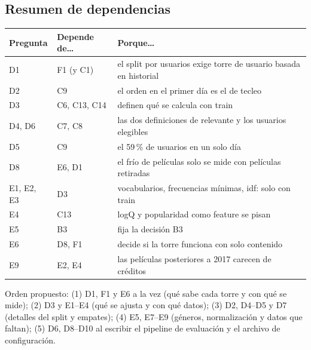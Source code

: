 \documentclass[a4paper,11pt]{article}
\begin{document}
\subsection*{Resumen de dependencias}
\begin{center}
\small
\begin{tabularx}{\linewidth}{lYY}
\toprule
Pregunta & Depende de\dots & Porque\dots \\
\midrule
D1 & F1 (y C1) & el split por usuarios exige torre de usuario basada en historial \\
D2 & C9 & el orden en el primer día es el de tecleo \\
D3 & C6, C13, C14 & definen qué se calcula con train \\
D4, D6 & C7, C8 & las dos definiciones de relevante y los usuarios elegibles \\
D5 & C9 & el 59\,\% de usuarios en un solo día \\
D8 & E6, D1 & el frío de películas solo se mide con películas retiradas \\
E1, E2, E3 & D3 & vocabularios, frecuencias mínimas, idf: solo con train \\
E4 & C13 & logQ y popularidad como feature se pisan \\
E5 & B3 & fija la decisión B3 \\
E6 & D8, F1 & decide si la torre funciona con solo contenido \\
E9 & E2, E4 & las películas posteriores a 2017 carecen de créditos \\
\bottomrule
\end{tabularx}
\end{center}
Orden propuesto: (1) D1, F1 y E6 a la vez (qué sabe cada torre y con qué se mide); (2) D3 y E1--E4 (qué se ajusta y con qué datos);
(3) D2, D4--D5 y D7 (detalles del split y empates); (4) E5, E7--E9 (géneros, normalización y datos que faltan); (5) D6, D8--D10 al escribir
el pipeline de evaluación y el archivo de configuración.

\end{document}
